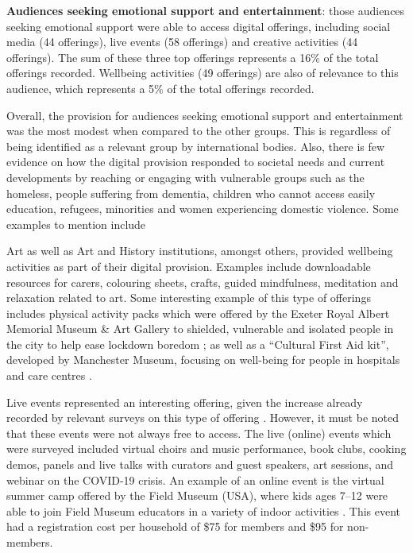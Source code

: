 \documentclass{egpubl}
\begin{document}
\noindent \textbf{Audiences seeking emotional support and entertainment}: those audiences seeking emotional support were able to access digital offerings, including social media (44 offerings), live events (58 offerings) and creative activities (44 offerings). The sum of these three top offerings represents a 16\% of the total offerings recorded. Wellbeing activities (49 offerings) are also of relevance to this audience, which represents a 5\% of the total offerings recorded. 

Overall, the provision for audiences seeking emotional support and entertainment was the most modest when compared to the other groups. This is regardless of being identified as a relevant group by international bodies. Also, there is few evidence on how the digital provision responded to societal needs and current developments by reaching or engaging with vulnerable groups such as the homeless, people suffering from dementia, children who cannot access easily education, refugees, minorities and women experiencing domestic violence. Some examples to mention include 

Art as well as Art and History institutions, amongst others, provided wellbeing activities as part of their digital provision. Examples include downloadable resources for carers, colouring sheets, crafts, guided mindfulness, meditation and relaxation related to art. Some interesting example  of this  type of offerings includes physical activity packs which were offered by the Exeter Royal Albert Memorial Museum \& Art Gallery to shielded, vulnerable and isolated people in the city to help ease lockdown boredom \cite{ex2020}; as well as a ``Cultural First Aid kit'', developed by Manchester Museum, focusing on well-being for people in hospitals and care centres \cite{man2020}. 

Live events represented an interesting offering, given the increase already recorded by relevant surveys on this type of offering \cite{InternationalCouncilofMuseums2020b}. However, it must be noted that these events were not always free to access. The live (online) events which were surveyed included virtual choirs and music performance, book clubs, cooking demos, panels and live talks with curators and guest speakers, art sessions, and webinar on the COVID-19 crisis. An example of an online event is the virtual summer camp offered by the Field Museum (USA), where kids ages 7–12 were able to join Field Museum educators in a variety of indoor activities \cite{fieldmuseum}. This event had a registration cost per household of \$75 for members and \$95 for non-members. 
\end{document}
